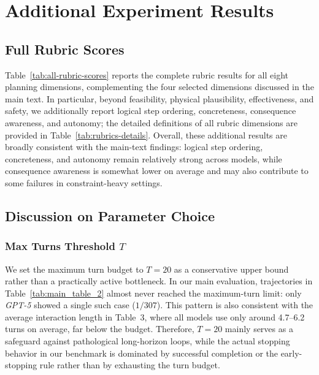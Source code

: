\documentclass{llmxive}
\begin{document}
\section{Additional Experiment Results}
\label{app:additional-experiment-results}

\subsection{Full Rubric Scores}
\label{app:full-rubric-scores}

Table~\ref{tab:all-rubric-scores} reports the complete rubric results for all eight planning dimensions, complementing the four selected dimensions discussed in the main text. 
In particular, beyond feasibility, physical plausibility, effectiveness, and safety, we additionally report logical step ordering, concreteness, consequence awareness, and autonomy; the detailed definitions of all rubric dimensions are provided in Table~\ref{tab:rubrics-details}. 
Overall, these additional results are broadly consistent with the main-text findings: logical step ordering, concreteness, and autonomy remain relatively strong across models, while consequence awareness is somewhat lower on average and may also contribute to some failures in constraint-heavy settings. 

\subsection{Discussion on Parameter Choice}
\label{app:discuss-parameter-choice}

\subsubsection{Max Turns Threshold \texorpdfstring{$T$}{T}}
\label{app:max-turns-threshold-ablation}

We set the maximum turn budget to $T=20$ as a conservative upper bound rather than a practically active bottleneck. 
In our main evaluation, trajectories in Table~\ref{tab:main_table_2} almost never reached the maximum-turn limit: only \textit{GPT-5} showed a single such case ($1/307$). This pattern is also consistent with the average interaction length in Table~3, where all models use only around 4.7--6.2 turns on average, far below the budget. Therefore, $T=20$ mainly serves as a safeguard against pathological long-horizon loops, while the actual stopping behavior in our benchmark is dominated by successful completion or the early-stopping rule rather than by exhausting the turn budget.
\end{document}
